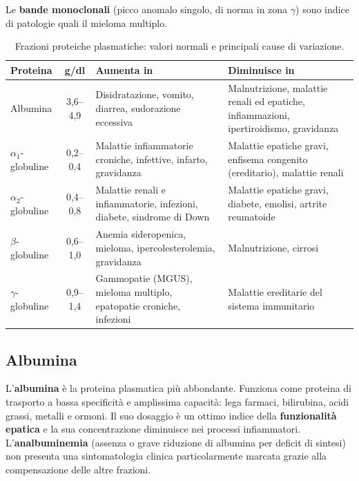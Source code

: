 Le \textbf{bande monoclonali} (picco anomalo singolo, di norma in zona
$\gamma$) sono indice di patologie quali il mieloma multiplo.

\begin{table}[htbp]
  \centering
  \small
  \renewcommand{\arraystretch}{1.3}
  \begin{tabularx}{\textwidth}{@{} l c X X @{}}
    \toprule
    \textbf{Proteina} & \textbf{g/dl} & \textbf{Aumenta in} & \textbf{Diminuisce in} \\
    \midrule
    Albumina
      & 3,6--4,9
      & Disidratazione, vomito, diarrea, sudorazione eccessiva
      & Malnutrizione, malattie renali ed epatiche, infiammazioni,
        ipertiroidismo, gravidanza \\
    $\alpha_1$-globuline
      & 0,2--0,4
      & Malattie infiammatorie croniche, infettive, infarto, gravidanza
      & Malattie epatiche gravi, enfisema congenito (ereditario), malattie renali \\
    $\alpha_2$-globuline
      & 0,4--0,8
      & Malattie renali e infiammatorie, infezioni, diabete, sindrome di Down
      & Malattie epatiche gravi, diabete, emolisi, artrite reumatoide \\
    $\beta$-globuline
      & 0,6--1,0
      & Anemia sideropenica, mieloma, ipercolesterolemia, gravidanza
      & Malnutrizione, cirrosi \\
    $\gamma$-globuline
      & 0,9--1,4
      & Gammopatie (MGUS), mieloma multiplo, epatopatie croniche, infezioni
      & Malattie ereditarie del sistema immunitario \\
    \bottomrule
  \end{tabularx}
  \caption{Frazioni proteiche plasmatiche: valori normali e principali cause di variazione.}
  \label{tab:proteine-plasmatiche}
\end{table}

\subsection{Albumina}

L'\textbf{albumina} è la proteina plasmatica più abbondante. Funziona come
proteina di trasporto a bassa specificità e amplissima capacità: lega farmaci,
bilirubina, acidi grassi, metalli e ormoni. Il suo dosaggio è un ottimo indice
della \textbf{funzionalità epatica} e la sua concentrazione diminuisce nei
processi infiammatori. L'\textbf{analbuminemia} (assenza o grave riduzione di
albumina per deficit di sintesi) non presenta una sintomatologia clinica
particolarmente marcata grazie alla compensazione delle altre frazioni.


